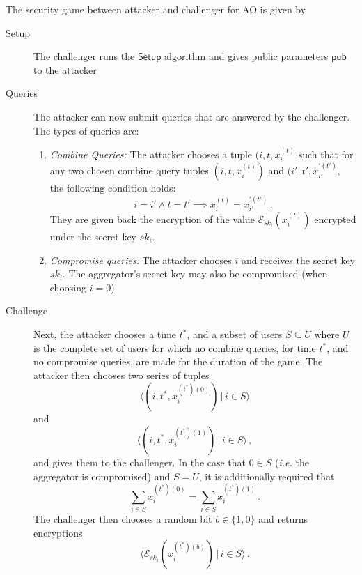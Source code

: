 \documentclass[twocolumn]{autart}
\begin{document}
The security game between attacker and challenger for AO is given by
\begin{description}
    \item[Setup] The challenger runs the $\mathsf{Setup}$ algorithm and gives public parameters $\mathsf{pub}$ to the attacker
    \item[Queries] The attacker can now submit queries that are answered by the challenger. The types of queries are:
    \begin{enumerate}
        \item \textit{Combine Queries:} The attacker chooses a tuple $(i,t,x^{(t)}_i$ such that for any two chosen combine query tuples $(i,t,x^{(t)}_i)$ and $(i',t',x^{\prime(t')}_{i'}$, the following condition holds:
        \begin{equation*}
            i = i' \wedge t = t' \implies x^{(t)}_{i} = x^{\prime(t')}_{i'}\,.
        \end{equation*}
        They are given back the encryption of the value $\mathcal{E}_{sk_i}(x^{(t)}_i)$ encrypted under the secret key $sk_i$.
        \item \textit{Compromise queries:} The attacker chooses $i$ and receives the secret key $sk_i$. The aggregator's secret key may also be compromised (when choosing $i=0$).
    \end{enumerate} 
    \item[Challenge] Next, the attacker chooses a time $t^*$, and a subset of users $S \subseteq U$ where $U$ is the complete set of users for which no combine queries, for time $t^*$, and no compromise queries, are made for the duration of the game. The attacker then chooses two series of tuples
    \begin{equation*}
        \langle(i,t^*,x^{(t^*)(0)}_i)\,|\,i \in S\rangle
    \end{equation*}
    and
    \begin{equation*}
        \langle(i,t^*,x^{(t^*)(1)}_i)\,|\, i \in S\rangle\,,
    \end{equation*}
    and gives them to the challenger. In the case that $0 \in S$ (\textit{i.e.} the aggregator is compromised) and $S = U$, it is additionally required that
    \begin{equation*}
        \sum_{i\in S} x^{(t^*)(0)}_i = \sum_{i \in S} x^{(t^*)(1)}_i\,.
    \end{equation*}
    The challenger then chooses a random bit $b \in \{1,0\}$ and returns encryptions 
    \begin{equation*}
        \langle\mathcal{E}_{sk_i}(x^{(t^*)(b)}_i)\,|\,i\in S\rangle\,.

\end{equation*}
\end{description}
\end{document}
